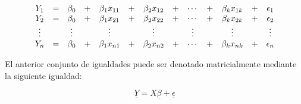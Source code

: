 \documentclass[
  a4paper,
  oneside,
  openany]{book}
\begin{document}
\[
\begin{array}{ c c c c c c c c c c c c c }
Y_{1}  & = & \beta_{0} & + & \beta_{1}x_{11}& +& \beta_{2}x_{12} & +& \cdots & + & \beta_{k}x_{1k} & + & \epsilon_{1}  \\ 
Y_{2}  & = & \beta_{0} & + & \beta_{1}x_{21}& +& \beta_{2}x_{22} & +& \cdots & + & \beta_{k}x_{2k} & + & \epsilon_{2}  \\
\vdots  &  & \vdots &  & \vdots& & \vdots & & \vdots & & \vdots &  & \vdots  \\
Y_{n}  & = & \beta_{0} & + & \beta_{1}x_{n1}& +& \beta_{2}x_{n2} & +& \cdots & + & \beta_{k}x_{nk} & + & \epsilon_{n}  \\ 
\end{array}
\]

El anterior conjunto de igualdades puede ser denotado matricialmente mediante la siguiente igualdad:

\[\underline{Y}=X\underline{\beta}+\underline{\epsilon}\]
\end{document}
